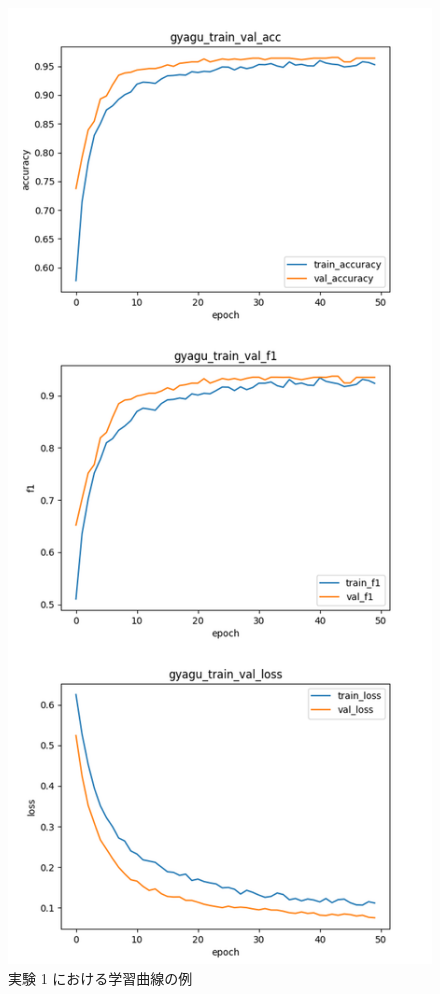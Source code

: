 \newpage
\begin{figure}[!h]
  \vspace{5mm}
  \centering
  \includegraphics[width=0.5\hsize]{doc/figures/ex1_graph_hotto_gyagu_big.png}
  \caption{実験 1 における学習曲線の例}
  \label{fig:ex1_graph}
\end{figure}

